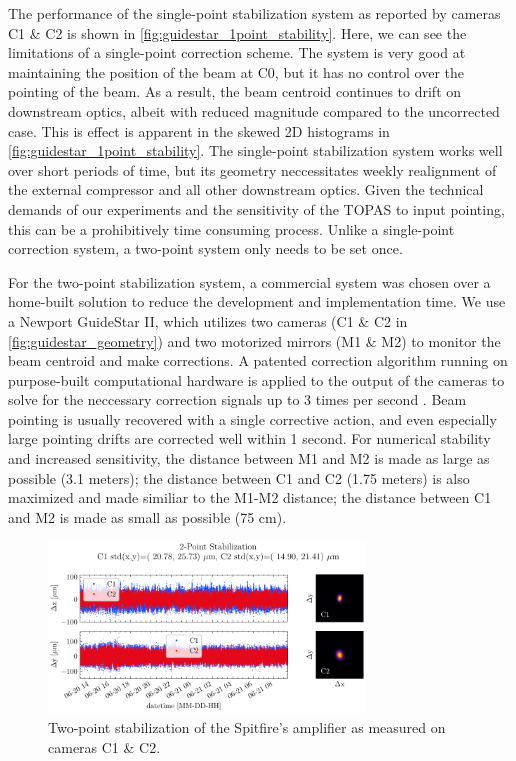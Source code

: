 The performance of the single-point stabilization system as reported by cameras C1 \& C2 is shown in \cref{fig:guidestar_1point_stability}. Here, we can see the limitations of a single-point correction scheme. The system is very good at maintaining the position of the beam at C0, but it has no control over the pointing of the beam. As a result, the beam centroid continues to drift on downstream optics, albeit with reduced magnitude compared to the uncorrected case. This is effect is apparent in the skewed 2D histograms in \cref{fig:guidestar_1point_stability}. The single-point stabilization system works well over short periods of time, but its geometry neccessitates weekly realignment of the external compressor and all other downstream optics. Given the technical demands of our experiments and the sensitivity of the TOPAS to input pointing, this can be a prohibitively time consuming process. Unlike a single-point correction system, a two-point system only needs to be set once.

For the two-point stabilization system, a commercial system was chosen over a home-built solution to reduce the development and implementation time. We use a Newport GuideStar II, which utilizes two cameras (C1 \& C2 in \cref{fig:guidestar_geometry}) and two motorized mirrors (M1 \& M2) to monitor the beam centroid and make corrections. A patented correction algorithm running on purpose-built computational hardware is applied to the output of the cameras to solve for the neccessary correction signals up to 3 times per second \cite{farinasOpticalBeamSteering2009}. Beam pointing is usually recovered with a single corrective action, and even especially large pointing drifts are corrected well within 1 second. For numerical stability and increased sensitivity, the distance between M1 and M2 is made as large as possible (3.1 meters); the distance between C1 and C2 (1.75 meters) is also maximized and made similiar to the M1-M2 distance; the distance between C1 and M2 is made as small as possible (75 cm).

\begin{figure}
	\centering
	\includegraphics[width=0.75\textwidth]{figures/chap2/Stability_GuideStarII_ON.pdf}
	\caption{Two-point stabilization of the Spitfire's amplifier as measured on cameras C1 \& C2.}
	\label{fig:guidestar_2point_stability}
\end{figure}

